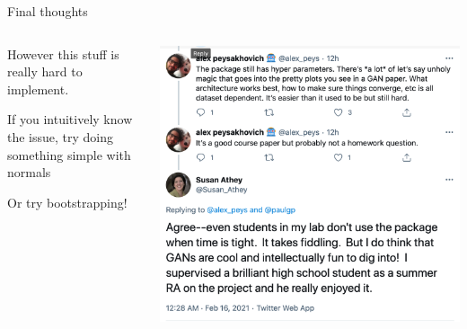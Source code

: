 \documentclass[notes,11pt, aspectratio=169]{beamer}
\newenvironment{wideitemize}{\itemize\addtolength{\itemsep}{10pt}}{\enditemize}
\begin{document}
\begin{frame}{Final thoughts}
\begin{columns}[T] %
\begin{column}{.5\textwidth}
  \begin{wideitemize}
  \item However this stuff is really hard to implement.
  \item If you intuitively know the issue, try doing something simple with normals
  \item Or try bootstrapping!
  \end{wideitemize}
  \end{column}
  \hfill%
  \begin{column}{.5\textwidth}
    \includegraphics[width=\linewidth]{images/gan_fiddle.png}
  \end{column}
  \end{columns}
\end{frame}
\end{document}
